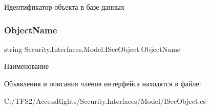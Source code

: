 Идентификатор объекта в базе данных 

\mbox{\label{interface_security_1_1_interfaces_1_1_model_1_1_i_sec_object_a184445e62d007ad236c4156914682238}} 
\subsubsection{\texorpdfstring{Object\+Name}{ObjectName}}
{\footnotesize\ttfamily string Security.\+Interfaces.\+Model.\+I\+Sec\+Object.\+Object\+Name\hspace{0.3cm}{\ttfamily [get]}}



Наименование 



Объявления и описания членов интерфейса находятся в файле\+:\begin{DoxyCompactItemize}
\item 
C\+:/\+T\+F\+S2/\+Access\+Rights/\+Security.\+Interfaces/\+Model/I\+Sec\+Object.\+cs\end{DoxyCompactItemize}

